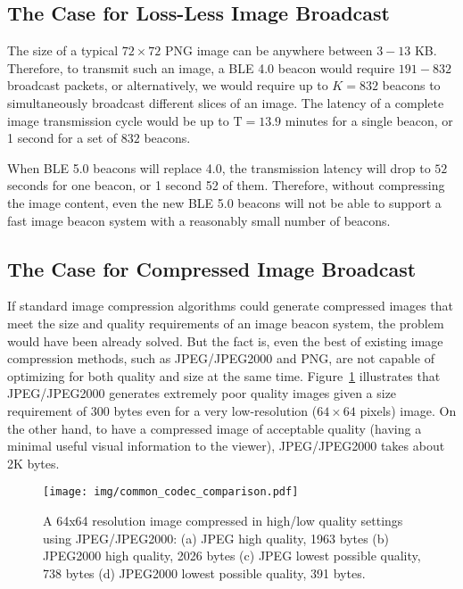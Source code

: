 \subsection{The Case for Loss-Less Image Broadcast}

The size of a typical $72\times 72$ PNG image can be anywhere between $3-13$ KB. Therefore, to transmit such an image, a BLE 4.0 beacon would require $191-832$ broadcast packets, or alternatively, we would require up to $K = 832$ beacons to simultaneously broadcast different slices of an image. The latency of a complete image transmission cycle would be up to $\mathrm{T = 13.9}$ minutes for a single beacon, or 1 second for a set of $832$ beacons.

When BLE 5.0 beacons will replace 4.0, the transmission latency will drop to $52$ seconds for one beacon, or 1 second 52 of them. Therefore, without compressing the image content, even the new BLE 5.0 beacons will not be able to support a fast image beacon system with a reasonably small number of beacons.


\subsection{The Case for Compressed Image Broadcast}

If standard image compression algorithms could generate compressed images that meet the size and quality requirements of an image beacon system, the problem would have been already solved. But the fact is, even the best of existing image compression methods, such as JPEG/JPEG2000 and PNG, are not capable of optimizing for both quality and size at the same time. Figure~\ref{fig:common_codec_comparison} illustrates that JPEG/JPEG2000 generates extremely poor quality images given a size requirement of 300 bytes even for a very low-resolution ($64 \times 64$ pixels) image. On the other hand, to have a compressed image of acceptable quality (having a minimal useful visual information to the viewer), JPEG/JPEG2000 takes about 2K bytes.

\begin{figure}[!htb]
    \begin{center}
	    \texttt{[image: img/common\_codec\_comparison.pdf]}
	    \vspace{-2em}
	    \caption{\footnotesize A 64x64 resolution image compressed in high/low quality settings using JPEG/JPEG2000: (a) JPEG high quality, 1963 bytes (b) JPEG2000 high quality, 2026 bytes (c) JPEG lowest possible quality, 738 bytes (d) JPEG2000 lowest possible quality, 391 bytes.}
	    \label{fig:common_codec_comparison}
    \end{center}
\end{figure}

